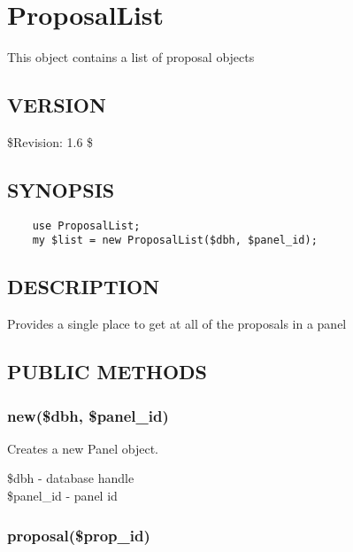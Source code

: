 \documentclass{article}
\begin{document}
\clearpage
\section{ProposalList\label{ProposalList}}


This object contains a list of proposal objects

\subsection*{VERSION\label{ProposalList_VERSION}}


\$Revision: 1.6 \$

\subsection*{SYNOPSIS\label{ProposalList_SYNOPSIS}}
\begin{verbatim}
    use ProposalList;
    my $list = new ProposalList($dbh, $panel_id);
\end{verbatim}
\subsection*{DESCRIPTION\label{ProposalList_DESCRIPTION}}


Provides a single place to get at all of the proposals in a panel

\subsection*{PUBLIC METHODS\label{ProposalList_PUBLIC_METHODS}}
\subsubsection*{new(\$dbh, \$panel\_id)\label{ProposalList_new_dbh_panel_id_}}


Creates a new Panel object.

\begin{description}

\item[{\$dbh - database handle}] \mbox{}
\item[{\$panel\_id - panel id}] \mbox{}\end{description}
\subsubsection*{proposal(\$prop\_id)\label{ProposalList_proposal_prop_id_}}
\end{document}
